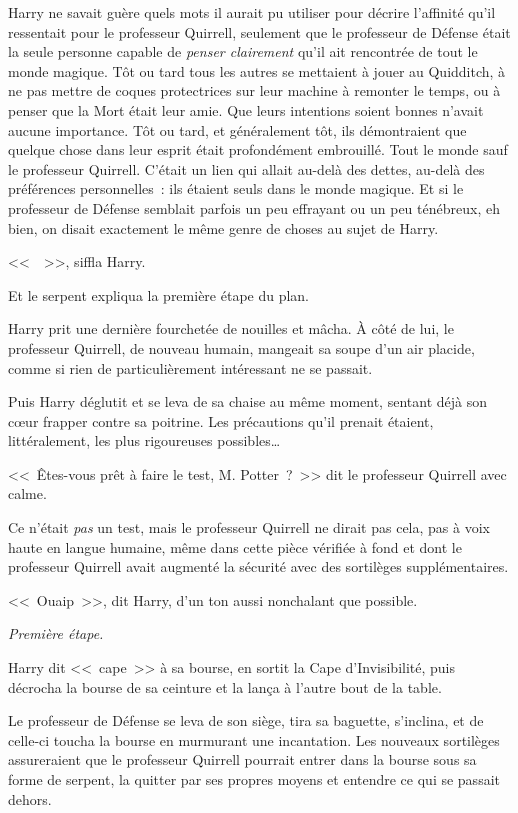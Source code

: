 Harry ne savait guère quels mots il aurait pu utiliser pour décrire l'affinité qu'il ressentait pour le professeur Quirrell, seulement que le professeur de Défense était la seule personne capable de \emph{penser clairement} qu'il ait rencontrée de tout le monde magique. Tôt ou tard tous les autres se mettaient à jouer au Quidditch, à ne pas mettre de coques protectrices sur leur machine à remonter le temps, ou à penser que la Mort était leur amie. Que leurs intentions soient bonnes n'avait aucune importance. Tôt ou tard, et généralement tôt, ils démontraient que quelque chose dans leur esprit était profondément embrouillé. Tout le monde sauf le professeur Quirrell. C'était un lien qui allait au-delà des dettes, au-delà des préférences personnelles~: ils étaient seuls dans le monde magique. Et si le professeur de Défense semblait parfois un peu effrayant ou un peu ténébreux, eh bien, on disait exactement le même genre de choses au sujet de Harry.

<<~~>>, siffla Harry.

Et le serpent expliqua la première étape du plan.

\later

Harry prit une dernière fourchetée de nouilles et mâcha. À côté de lui, le professeur Quirrell, de nouveau humain, mangeait sa soupe d'un air placide, comme si rien de particulièrement intéressant ne se passait.

Puis Harry déglutit et se leva de sa chaise au même moment, sentant déjà son cœur frapper contre sa poitrine. Les précautions qu'il prenait étaient, littéralement, les plus rigoureuses possibles…

<<~Êtes-vous prêt à faire le test, M. Potter~?~>> dit le professeur Quirrell avec calme.

Ce n'était \emph{pas} un test, mais le professeur Quirrell ne dirait pas cela, pas à voix haute en langue humaine, même dans cette pièce vérifiée à fond et dont le professeur Quirrell avait augmenté la sécurité avec des sortilèges supplémentaires.

<<~Ouaip~>>, dit Harry, d'un ton aussi nonchalant que possible.

\emph{Première étape.}

Harry dit <<~cape~>> à sa bourse, en sortit la Cape d'Invisibilité, puis décrocha la bourse de sa ceinture et la lança à l'autre bout de la table.

Le professeur de Défense se leva de son siège, tira sa baguette, s'inclina, et de celle-ci toucha la bourse en murmurant une incantation. Les nouveaux sortilèges assureraient que le professeur Quirrell pourrait entrer dans la bourse sous sa forme de serpent, la quitter par ses propres moyens et entendre ce qui se passait dehors.

